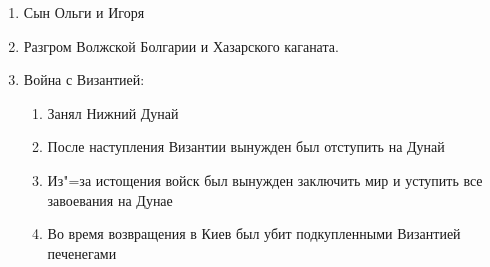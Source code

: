 \begin{enumerate}
    \item{Сын Ольги и Игоря}
    \item{Разгром Волжской Болгарии и Хазарского каганата.}
    \item{Война с Византией:

        \begin{enumerate}
            \item{Занял Нижний Дунай}
            \item{После наступления Византии вынужден был отступить на Дунай}
            \item{Из"=за истощения войск был вынужден заключить мир и уступить все завоевания на Дунае}
            \item{Во время возвращения в Киев был убит подкупленными Византией печенегами}
        \end{enumerate}
    }
\end{enumerate}
